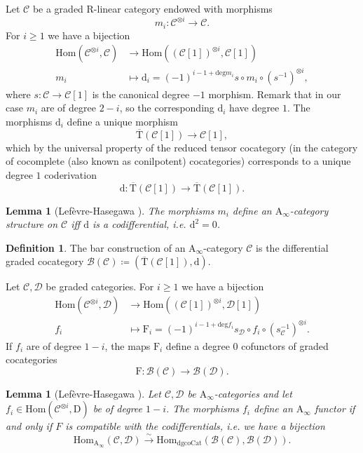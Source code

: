 \documentclass{article}
\theoremstyle{plain}
\newtheorem{lemma}[theorem]{Lemma}
\theoremstyle{definition}
\newtheorem{definition}[theorem]{Definition}
\theoremstyle{remark}
\newcommand{\mr}{\mathrm}
\newcommand{\Aa}{\mr{A}_{\infty}}
\newcommand{\3}{\vspace{3mm}}
\newcommand{\2}{\vspace{2mm}}
\newcommand{\1}{\vspace{1mm}}
\begin{document}
Let $\mathcal{C}$ be a graded $\mr{R}$-linear category endowed with morphisms $$m_{i}: \mathcal{C}^{\otimes i} \to \mathcal{C}.$$ For $i \ge 1$ we have a bijection
\begin{align*}
\mr{Hom}(\mathcal{C}^{\otimes i},\mathcal{C}) &\to \mr{Hom}((\mathcal{C}[1])^{\otimes i},\mathcal{C}[1])\\
 m_i &\mapsto \mr{d}_i=(-1)^{i-1+\mr{deg}m_i}s\circ m_i\circ (s^{-1})^{\otimes i},
\end{align*}
 where $s:\mathcal{C} \to \mathcal{C}[1]$ is the canonical degree $-1$ morphism. Remark that in our case $m_i$ are of degree $2-i$, so the corresponding $\mr{d}_i$ have degree $1$. The morphisms $\mr{d}_i$ define a unique morphism $$\overline{\mr{T}}(\mathcal{C}[1]) \to \mathcal{C}[1],$$ which by the universal property of the reduced tensor cocategory (in the category of cocomplete (also known as conilpotent) cocategories) corresponds to a unique degree $1$ coderivation $$\mr{d} : \overline{\mr{T}}(\mathcal{C}[1]) \to \overline{\mr{T}}(\mathcal{C}[1]).$$

\begin{lemma}[Lefèvre-Hasegawa \cite{lefvrehasegawa2003sur}]
 The morphisms $m_i$ define an $\Aa$-category structure on $\mathcal{C}$ iff $\mr{d}$ is a codifferential, i.e. $\mr{d}^2=0$.
\end{lemma}
\2
\begin{definition}
 The bar construction of an $\Aa$-category $\mathcal{C}$ is the differential graded cocategory $\mathcal{B}(\mathcal{C})\coloneqq(\overline{\mr{T}}(\mathcal{C}[1]),\mr d)$.
\end{definition}
\2
Let $\mathcal{C}, \mathcal{D}$ be graded categories. For $i\ge 1$ we have a bijection
\begin{align*}
\mr{Hom}(\mathcal{C}^{\otimes i},\mathcal{D}) &\to \mr{Hom}((\mathcal{C}[1])^{\otimes i},\mathcal{D}[1])\\
 f_i &\mapsto \mr{F}_i=(-1)^{i-1+\mr{deg}f_i}s_{\mathcal{D}}\circ f_i\circ (s_{\mathcal{C}}^{-1})^{\otimes i}.
\end{align*}
If $f_i$ are of degree $1-i$, the maps $\mr{F}_i$ define a degree $0$ cofunctors of graded cocategories $$\mr{F}:\mathcal{B}(\mathcal{C}) \to \mathcal{B}(\mathcal{D}).$$
\begin{lemma}[Lefèvre-Hasegawa \cite{lefvrehasegawa2003sur}]
 Let $\mathcal{C}, \mathcal{D}$ be $\Aa$-categories and let $f_i \in \mr{Hom}(\mathcal{C}^{\otimes i},\mr{D})$ be of degree $1-i$. The morphisms $f_i$ define an $\Aa$ functor if and only if $F$ is compatible with the codifferentials, i.e. we have a bijection
 $$\mr{Hom}_{\mr{A}_{\infty}}(\mathcal{C},\mathcal{D}) \xrightarrow{\sim} \mr{Hom}_{\mr{dgcoCat}}(\mathcal{B}(\mathcal{C}),\mathcal{B}(\mathcal{D})).$$
\end{lemma}
\end{document}
